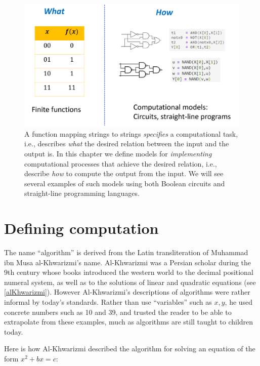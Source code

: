 \begin{figure}
\centering
\includegraphics[width=\textwidth, height=0.25\paperheight, keepaspectratio]{../figure/compchapterwhatvshow.png}
\caption{A function mapping strings to strings \emph{specifies} a
computational task, i.e., describes \emph{what} the desired relation
between the input and the output is. In this chapter we define models
for \emph{implementing} computational processes that achieve the desired
relation, i.e., describe \emph{how} to compute the output from the
input. We will see several examples of such models using both Boolean
circuits and straight-line programming languages.}
\label{compchapwhatvshowfig}
\end{figure}

\section{Defining computation}\label{Defining-computation}

The name ``algorithm'' is derived from the Latin transliteration of
Muhammad ibn Musa al-Khwarizmi's name. Al-Khwarizmi was a Persian
scholar during the 9th century whose books introduced the western world
to the decimal positional numeral system, as well as to the solutions of
linear and quadratic equations (see \cref{alKhwarizmi}). However
Al-Khwarizmi's descriptions of algorithms were rather informal by
today's standards. Rather than use ``variables'' such as \(x,y\), he
used concrete numbers such as 10 and 39, and trusted the reader to be
able to extrapolate from these examples, much as algorithms are still
taught to children today.

Here is how Al-Khwarizmi described the algorithm for solving an equation
of the form \(x^2 +bx = c\):

